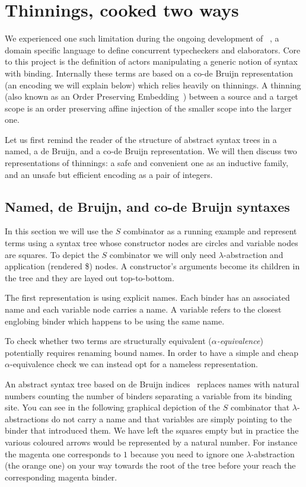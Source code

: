 \section{Thinnings, cooked two ways}\label{sec:codebruijn}

We experienced one such limitation during the ongoing development of
\typos~\cite{MANUAL:talk/types/Allais22}, a domain specific language
to define concurrent typecheckers and elaborators.
%
Core to this project is the definition of actors manipulating a generic notion
of syntax with binding. Internally these terms are based on a co-de Bruijn
representation (an encoding we will explain below) which relies heavily on
thinnings.
%
A thinning (also known as an Order Preserving
Embedding~\cite{MANUAL:phd/nott/Chapman09})
between a source and a target scope is an order preserving affine injection
of the smaller scope into the larger one.

Let us first remind the reader of the structure of abstract syntax trees in a
named, a de Bruijn, and a co-de Bruijn representation. We will then discuss two
representations of thinnings: a safe and convenient one as an inductive family,
and an unsafe but efficient encoding as a pair of integers.

\subsection{Named, de Bruijn, and co-de Bruijn syntaxes}

In this section we will use the $S$ combinator as a running example and represent
terms using a syntax tree whose constructor nodes are circles and variable nodes
are squares.
%
To depict the $S$ combinator we will only need $\lambda{}$-abstraction and
application (rendered \$) nodes. A constructor's arguments become its children
in the tree and they are layed out top-to-bottom.

The first representation is using explicit names. Each binder has an associated
name and each variable node carries a name. A variable refers to the closest englobing
binder which happens to be using the same name.


To check whether two terms are structurally equivalent (\emph{$\alpha$-equivalence})
potentially requires renaming bound names.
%
In order to have a simple and cheap $\alpha$-equivalence check we can instead opt
for a nameless representation.

An abstract syntax tree based on de Bruijn indices~\cite{MANUAL:journals/math/debruijn72}
replaces names with natural numbers counting the number of binders separating a variable
from its binding site.
%
You can see in the following graphical depiction of the $S$ combinator that
$\lambda$-abstractions do not carry a name and that variables are simply pointing
to the binder that introduced them. We have left the squares empty but in practice
the various coloured arrows would be represented by a natural number.
%
For instance the {\color{magenta}magenta} one corresponds to $1$ because you need
to ignore one $\lambda{}$-abstraction (the {\color{orange}orange} one) on your way
towards the root of the tree before your reach the corresponding magenta binder.

